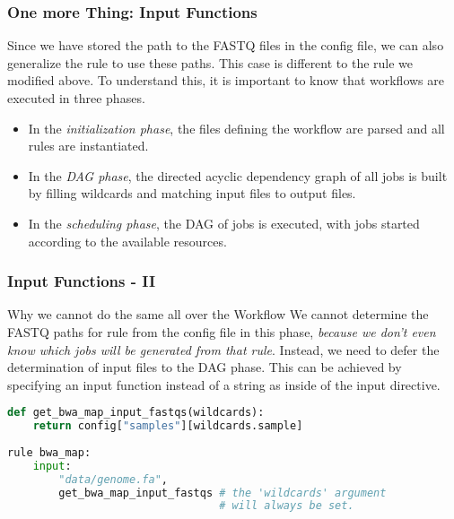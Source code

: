 \begin{frame}[fragile]
	\frametitle{One more Thing: Input Functions}
	Since we have stored the path to the FASTQ files in the config file, we can also generalize the rule  to use these paths. This case is different to the rule  we modified above. To understand this, it is important to know that \Snakemake{} workflows are executed in three phases.
	\begin{itemize}[<+->]
		\item In the \emph{initialization phase}, the files defining the workflow are parsed and all rules are instantiated.
		\item In the \emph{DAG phase}, the directed acyclic dependency graph of all jobs is built by filling wildcards and matching input files to output files.
		\item In the \emph{scheduling phase}, the DAG of jobs is executed, with jobs started according to the available resources.
	\end{itemize}
\end{frame}

\begin{frame}[fragile]
	\frametitle{Input Functions - II}
	\begin{alertblock}{Why we cannot do the same all over the Workflow}
		We cannot determine the FASTQ paths for rule  from the config file in this phase, \emph{because we don’t even know which jobs will be generated from that rule}. Instead, we need to defer the determination of input files to the DAG phase. This can be achieved by specifying an input function instead of a string as inside of the input directive.
	\end{alertblock}
	\begin{lstlisting}[language=Python,style=Python]
def get_bwa_map_input_fastqs(wildcards):
    return config["samples"][wildcards.sample]
		
rule bwa_map:
    input:
        "data/genome.fa",
        get_bwa_map_input_fastqs # the 'wildcards' argument
                                 # will always be set.
	\end{lstlisting}
\end{frame}

